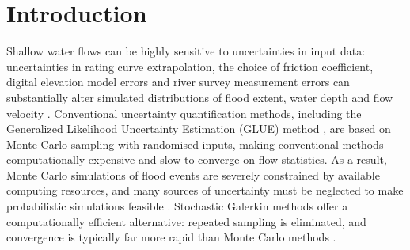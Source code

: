 \section{Introduction}
Shallow water flows can be highly sensitive to uncertainties in input data: uncertainties in rating curve extrapolation, the choice of friction coefficient, digital elevation model errors and river survey measurement errors can substantially alter simulated distributions of flood extent, water depth and flow velocity \citep{bates2014,kim-sanders2016,jung-merwade2012,montanari-dibaldassarre2013}.
Conventional uncertainty quantification methods, including the Generalized Likelihood Uncertainty Estimation (GLUE) method \citep{beven-binley1992}, are based on Monte Carlo sampling with randomised inputs, making conventional methods computationally expensive and slow to converge on flow statistics.
As a result, Monte Carlo simulations of flood events are severely constrained by available computing resources, and many sources of uncertainty must be neglected to make probabilistic simulations feasible \citep{neal2013}.
Stochastic Galerkin methods offer a computationally efficient alternative: repeated sampling is eliminated, and convergence is typically far more rapid than Monte Carlo methods \citep{xiu2009,ge2008}.


